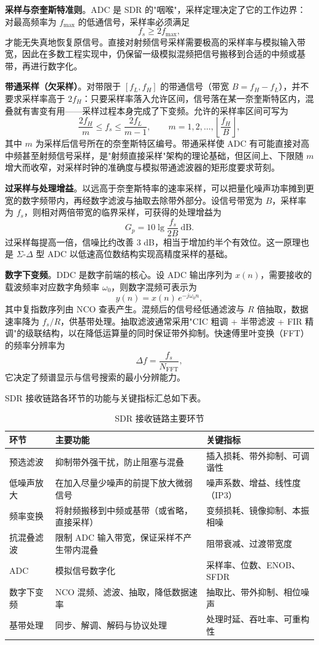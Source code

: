 \textbf{采样与奈奎斯特准则}。ADC 是 SDR 的"咽喉"，采样定理决定了它的工作边界：对最高频率为 $f_{\max}$ 的低通信号，采样率必须满足
\[
f_s \ge 2f_{\max},
\]
才能无失真地恢复原信号。直接对射频信号采样需要极高的采样率与模拟输入带宽，因此在多数工程实现中，仍保留一级模拟混频把信号搬移到合适的中频或基带，再进行数字化。

\textbf{带通采样（欠采样）}。对带限于 $[f_L, f_H]$ 的带通信号（带宽 $B = f_H - f_L$），并不要求采样率高于 $2f_H$：只要采样率落入允许区间，信号落在某一奈奎斯特区内，混叠就有害变有用——采样过程本身完成了下变频。允许的采样率区间可写为
\[
\frac{2f_H}{m} \le f_s \le \frac{2f_L}{m-1}, \qquad m = 1, 2, \ldots, \left\lfloor \frac{f_H}{B} \right\rfloor,
\]
其中 $m$ 为采样后信号所在的奈奎斯特区编号。带通采样使 ADC 有可能直接对高中频甚至射频信号采样，是"射频直接采样"架构的理论基础，但区间上、下限随 $m$ 增大而收窄，对采样时钟的准确度与模拟带通滤波器的矩形度要求苛刻。

\textbf{过采样与处理增益}。以远高于奈奎斯特率的速率采样，可以把量化噪声功率摊到更宽的数字频带内，再经数字滤波与抽取去除带外部分。设信号带宽为 $B$，采样率为 $f_s$，则相对两倍带宽的临界采样，可获得的处理增益为
\[
G_p = 10\lg\frac{f_s}{2B} \ \mathrm{dB}.
\]
过采样每提高一倍，信噪比约改善 3 dB，相当于增加约半个有效位。这一原理也是 $\Sigma$-$\Delta$ 型 ADC 以低速高位数结构实现高精度采样的基础。

\textbf{数字下变频}。DDC 是数字前端的核心。设 ADC 输出序列为 $x(n)$，需要接收的载波频率对应数字角频率 $\omega_0$，则数字混频可表示为
\[
y(n) = x(n)\, e^{-j\omega_0 n},
\]
其中复指数序列由 NCO 查表产生。混频后的信号经低通滤波与 $R$ 倍抽取，数据速率降为 $f_s/R$，供基带处理。抽取滤波通常采用"CIC 粗调 + 半带滤波 + FIR 精调"的级联结构，以在降低运算量的同时保证带外抑制。快速傅里叶变换（FFT）的频率分辨率为
\[
\Delta f = \frac{f_s}{N_{\mathrm{FFT}}},
\]
它决定了频谱显示与信号搜索的最小分辨能力。

SDR 接收链路各环节的功能与关键指标汇总如下表。

\begin{table}[htbp]
\centering
\caption{SDR 接收链路主要环节}
\label{tab:sdr_chain}
\begin{tabular}{|p{2.6cm}|p{5.4cm}|p{5.6cm}|}
\hline
\textbf{环节} & \textbf{主要功能} & \textbf{关键指标} \\
\hline
预选滤波 & 抑制带外强干扰，防止阻塞与混叠 & 插入损耗、带外抑制、可调谐性 \\
\hline
低噪声放大 & 在加入尽量少噪声的前提下放大微弱信号 & 噪声系数、增益、线性度（IP3） \\
\hline
频率变换 & 将射频搬移到中频或基带（或省略，直接采样） & 变频损耗、镜像抑制、本振相噪 \\
\hline
抗混叠滤波 & 限制 ADC 输入带宽，保证采样不产生带内混叠 & 阻带衰减、过渡带宽度 \\
\hline
ADC & 模拟信号数字化 & 采样率、位数、ENOB、SFDR \\
\hline
数字下变频 & NCO 混频、滤波、抽取，降低数据速率 & 抽取比、带外抑制、相位噪声 \\
\hline
基带处理 & 同步、解调、解码与协议处理 & 处理时延、吞吐率、可重构性 \\
\hline
\end{tabular}
\end{table}

